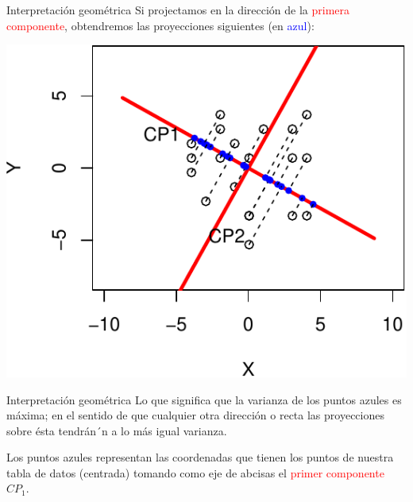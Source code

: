 \documentclass[
  ignorenonframetext,
]{beamer}
\newcommand\blue[1]{\textcolor{blue}{#1}}
\newcommand\red[1]{\textcolor{red}{#1}}
\begin{document}
\begin{frame}{Interpretación geométrica}
\protect\hypertarget{interpretaciuxf3n-geomuxe9trica-1}{}
Si projectamos en la dirección de la \red{primera componente},
obtendremos las proyecciones siguientes (en \blue{azul}):

\begin{center}\includegraphics{AnalisisComponentesPrincipales_fusion_files/figure-beamer/inter3-1} \end{center}
\end{frame}

\begin{frame}{Interpretación geométrica}
\protect\hypertarget{interpretaciuxf3n-geomuxe9trica-2}{}
Lo que significa que la varianza de los puntos azules es máxima; en el
sentido de que cualquier otra dirección o recta las proyecciones sobre
ésta tendrán´n a lo más igual varianza. \medskip

Los puntos azules representan las coordenadas que tienen los puntos de
nuestra tabla de datos (centrada) tomando como eje de abcisas el
\red{primer componente} \(CP_1\).
\end{frame}
\end{document}
